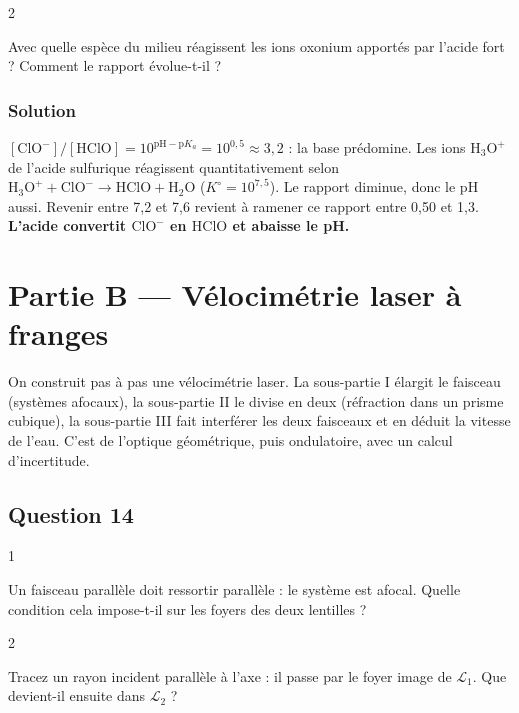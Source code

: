 \documentclass[11pt,a4paper]{article}
\begin{document}
\begin{indication}{2}

Avec quelle espèce du milieu réagissent les ions oxonium apportés par l'acide fort ? Comment le rapport évolue-t-il ?

\end{indication}

\hypertarget{solution-12}{%
\subsubsection{Solution}\label{solution-12}}

\([\mathrm{ClO^-}]/[\mathrm{HClO}] = 10^{\mathrm{pH} - \mathrm pK_a} = 10^{0{,}5} \approx 3{,}2\) : la base prédomine. Les ions \(\mathrm{H_3O^+}\) de l'acide sulfurique réagissent quantitativement selon \(\mathrm{H_3O^+} + \mathrm{ClO^-} \to \mathrm{HClO} + \mathrm{H_2O}\) (\(K^\circ = 10^{7{,}5}\)). Le rapport diminue, donc le pH aussi. Revenir entre 7,2 et 7,6 revient à ramener ce rapport entre 0,50 et 1,3. \textbf{L'acide convertit \(\mathrm{ClO^-}\) en \(\mathrm{HClO}\) et abaisse le pH.}

\hypertarget{partie-b-vuxe9locimuxe9trie-laser-uxe0-franges}{%
\section{Partie B --- Vélocimétrie laser à franges}\label{partie-b-vuxe9locimuxe9trie-laser-uxe0-franges}}

On construit pas à pas une vélocimétrie laser. La sous-partie I élargit le faisceau (systèmes afocaux), la sous-partie II le divise en deux (réfraction dans un prisme cubique), la sous-partie III fait interférer les deux faisceaux et en déduit la vitesse de l'eau. C'est de l'optique géométrique, puis ondulatoire, avec un calcul d'incertitude.

\hypertarget{question-14}{%
\subsection{Question 14}\label{question-14}}

\begin{indication}{1}

Un faisceau parallèle doit ressortir parallèle : le système est afocal. Quelle condition cela impose-t-il sur les foyers des deux lentilles ?

\end{indication}

\begin{indication}{2}

Tracez un rayon incident parallèle à l'axe : il passe par le foyer image de \(\mathcal L_1\). Que devient-il ensuite dans \(\mathcal L_2\) ?

\end{indication}
\end{document}
